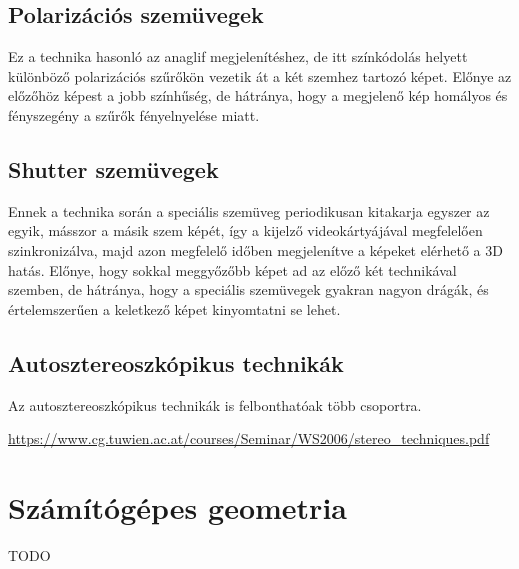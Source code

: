 \documentclass[12pt]{article}
\theoremstyle{plain}
\begin{document}
\subsection{Polarizációs szemüvegek}

Ez a technika hasonló az anaglif megjelenítéshez, de itt színkódolás helyett különböző polarizációs szűrőkön vezetik át a két szemhez tartozó képet. Előnye az előzőhöz képest a jobb színhűség, de hátránya, hogy a megjelenő kép homályos és fényszegény a szűrők fényelnyelése miatt.

\subsection{Shutter szemüvegek}

Ennek a technika során a speciális szemüveg periodikusan kitakarja egyszer az egyik, másszor a másik szem képét, így a kijelző videokártyájával megfelelően szinkronizálva, majd azon megfelelő időben megjelenítve a képeket elérhető a 3D hatás. Előnye, hogy sokkal meggyőzőbb képet ad az előző két technikával szemben, de hátránya, hogy a speciális szemüvegek gyakran nagyon drágák, és értelemszerűen a keletkező képet kinyomtatni se lehet. \newline
\subsection{Autosztereoszkópikus technikák}
Az autosztereoszkópikus technikák is felbonthatóak több csoportra. 
 
\url{https://www.cg.tuwien.ac.at/courses/Seminar/WS2006/stereo_techniques.pdf}

\section{Számítógépes geometria}

TODO




\end{document}
